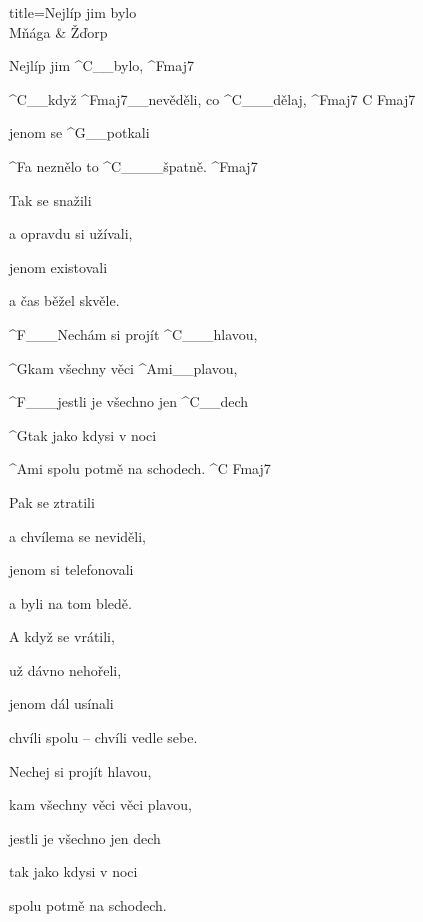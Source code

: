 \begin{song}{title=\predtitle\centering Nejlíp jim bylo \\\large Mňága \& Žďorp  \vspace*{-0.3cm}}  %
\begin{centerjustified}


\sloka
	Nejlíp jim ^{C{\color{white}\_\_}}bylo, ^{Fmaj7}

	^{C{\color{white}\_\_}}když ^{Fmaj7{\color{white}\_\_}}nevěděli, co ^{C{\color{white}\_\_\_}}dělaj, ^{Fmaj7\,\,C\,\,Fmaj7}

	jenom se ^{G{\color{white}\_\_}}potkali

	^{F}a neznělo to ^{C{\color{white}\_\_\_\_}}špatně. ^{Fmaj7}

\sloka
	Tak se snažili

	a opravdu si užívali,

	jenom existovali

	a čas běžel skvěle.

	^{F{\color{white}\_\_\_}}Nechám si projít ^{C{\color{white}\_\_\_}}hlavou,

	^{G}kam všechny věci ^{Ami{\color{white}\_\_}}plavou,

	^{F{\color{white}\_\_\_}}jestli je všechno jen ^{C{\color{white}\_\_}}dech

	^{G}tak jako kdysi v noci

	^{Ami\,\,}spolu potmě na schodech. ^{C\,\,Fmaj7}

\sloka
	Pak se ztratili

	a chvílema se neviděli,

	jenom si telefonovali

	a byli na tom bledě.

\sloka
	A když se vrátili,

	už dávno nehořeli,

	jenom dál usínali

	chvíli spolu -- chvíli vedle sebe.


	Nechej si projít hlavou,

	kam všechny věci věci plavou,

	jestli je všechno jen dech

	tak jako kdysi v noci

	spolu potmě na schodech.


\end{centerjustified}
\setcounter{Slokočet}{0}
\end{song}
